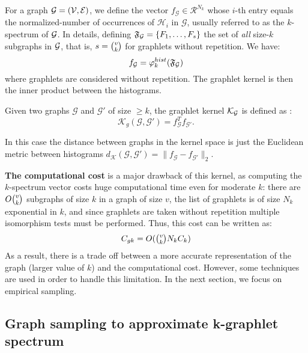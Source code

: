 For a graph $\mathcal{G}=(\mathcal{V},\mathcal{E})$, we define the vector $f_\mathcal{G}\in \mathcal{R}^{N_k}$ whose $i$-th entry equals the normalized-number of occurrences of $\mathcal{H}_i$ in $\mathcal{G}$, usually referred to as the $k$-spectrum of $\mathcal{G}$. In details, defining $\mathfrak{F}_{\mathcal{G}}=\{F_1,\ldots,F_s\}$ the set of \emph{all} size-$k$ subgraphs in $\mathcal{G}$, that is, $s=\tbinom{v}{k}$ for graphlets without repetition. We have:
\[
f_{\mathcal{G}}=\varphi_k^{hist}(\mathfrak{F}_{\mathcal{G}})
\]
where graphlets are considered without repetition. The graphlet kernel is then the inner product between the histograms.
\begin{definition}
Given two graphs $\mathcal{G}$ and $\mathcal{G}'$ of size $\geq k$, the graphlet kernel $\mathcal{K}_{\mathcal{G}}$ is defined as \citep{graphlet_kernel}:
\begin{equation}
\label{eq:graphlet_kernel}
    \mathcal{K}_g(\mathcal{G},\mathcal{G}')=f_{\mathcal{G}}^Tf_{\mathcal{G}'}.
\end{equation}
\end{definition}
In this case the distance between graphs in the kernel space is just the Euclidean metric between histograms $d_\mathcal{K}({\mathcal{G}},{\mathcal{G}'}) = \|f_{\mathcal{G}} - f_{{\mathcal{G}'}}\|_2$.

\textbf{The computational cost} is a major drawback of this kernel, as computing the $k$-spectrum vector costs huge computational time even for moderate $k$: there are $O\tbinom{v}{k}$ subgraphs of size $k$ in a graph of size $v$, the list of graphlets is of size $N_k$ exponential in $k$, and since graphlets are taken without repetition multiple isomorphism tests must be performed. Thus, this cost can be written as:
\begin{equation}
\label{eq:cost_graphlet}
    C_{gk}= O(\tbinom{v}{k} N_k C_k)
\end{equation}
As a result, there is a trade off between a more accurate representation of the graph (larger value of $k$) and the computational cost. However, some techniques are used in order to handle this limitation. In the next section, we focus on empirical sampling.

\subsection{Graph sampling to approximate k-graphlet spectrum}
\label{graph_sampling}

